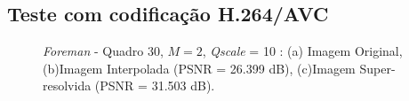 \subsection{Teste com codificação H.264/AVC}
\begin{figure}[h]
    \centering
    \qquad
	

    \caption{\textit{Foreman} - Quadro 30, $M = 2$, \textit{Qscale} = 10 : (a) Imagem Original, (b)Imagem Interpolada (PSNR = 26.399 dB), (c)Imagem Super-resolvida (PSNR = 31.503 dB).}
	    
    \label{fig:4}
\end{figure}

